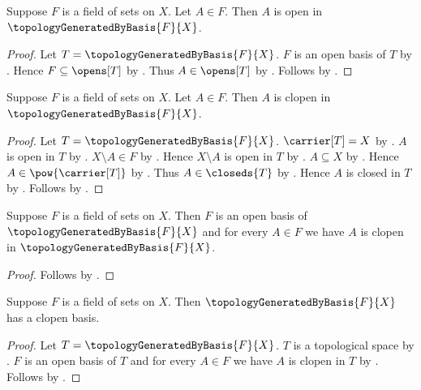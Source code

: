 \begin{proposition}\label{field_of_sets_member_open_in_generated_topology}
    Suppose $F$ is a field of sets on $X$.
    Let $A\in F$.
    Then $A$ is open in $\topologyGeneratedByBasis{F}{X}$.
\end{proposition}
\begin{proof}
    Let $T=\topologyGeneratedByBasis{F}{X}$.
    $F$ is an open basis of $T$ by
        .
    Hence $F\subseteq\opens[T]$ by .
    Thus $A\in\opens[T]$ by .
    Follows by .
\end{proof}

\begin{proposition}\label{field_of_sets_member_clopen_in_generated_topology}
    Suppose $F$ is a field of sets on $X$.
    Let $A\in F$.
    Then $A$ is clopen in $\topologyGeneratedByBasis{F}{X}$.
\end{proposition}
\begin{proof}
    Let $T=\topologyGeneratedByBasis{F}{X}$.
    $\carrier[T]=X$ by
        .
    $A$ is open in $T$ by
        .
    $X\setminus A\in F$ by .
    Hence $X\setminus A$ is open in $T$ by
        .
    $A\subseteq X$ by
        .
    Hence $A\in\pow{\carrier[T]}$ by
        .
    Thus $A\in\closeds{T}$ by
        .
    Hence $A$ is closed in $T$ by .
    Follows by .
\end{proof}

\begin{theorem}\label{field_of_sets_is_clopen_open_basis}
    Suppose $F$ is a field of sets on $X$.
    Then $F$ is an open basis of $\topologyGeneratedByBasis{F}{X}$ and
        for every $A\in F$ we have
            $A$ is clopen in $\topologyGeneratedByBasis{F}{X}$.
\end{theorem}
\begin{proof}
    Follows by
        .
\end{proof}

\begin{theorem}\label{field_generated_topology_has_clopen_basis}
    Suppose $F$ is a field of sets on $X$.
    Then $\topologyGeneratedByBasis{F}{X}$ has a clopen basis.
\end{theorem}
\begin{proof}
    Let $T=\topologyGeneratedByBasis{F}{X}$.
    $T$ is a topological space by
        .
    $F$ is an open basis of $T$ and for every $A\in F$ we have
        $A$ is clopen in $T$ by
        .
    Follows by .
\end{proof}

